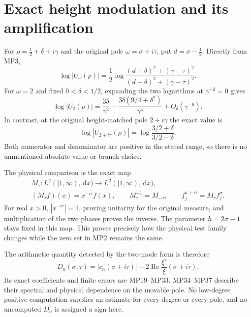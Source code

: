 \documentclass[11pt]{article}
\newcommand{\dd}{\,\mathrm d}
\newcommand{\Rea}{\operatorname{Re}}
\begin{document}
\section{Exact height modulation and its amplification}
For $\rho=\tfrac12+\delta+i\gamma$ and the original pole
$\omega=\sigma+i\tau$, put $d=\sigma-\tfrac12$. Directly from MP3,
\begin{equation}
 \log|U_\omega(\rho)|
 =\frac12\log\frac{(d+\delta)^2+(\gamma-\tau)^2}
                         {(d-\delta)^2+(\gamma-\tau)^2}.
 \tag{MP34}
\end{equation}
For $\omega=2$ and fixed $0<\delta<1/2$, expanding the two logarithms
at $\gamma^{-2}=0$ gives
\begin{equation}
 \log|U_2(\rho)|
 =\frac{3\delta}{\gamma^2}
   -\frac{3\delta(9/4+\delta^2)}{\gamma^4}
   +O_\delta(\gamma^{-6}).\tag{MP35}
\end{equation}
In contrast, at the original height-matched pole $2+i\gamma$ the exact
value is
\begin{equation}
 \log|U_{2+i\gamma}(\rho)|
       =\log\frac{3/2+\delta}{3/2-\delta}.
 \tag{MP36}
\end{equation}
Both numerator and denominator are positive in the stated range, so
there is no unmentioned absolute-value or branch choice.

The physical comparison is the exact map
\begin{equation}
 \begin{gathered}
 M_\tau:L^2([1,\infty),\dd x)\longrightarrow L^2([1,\infty),\dd x),
 \\ (M_\tau f)(x)=x^{-i\tau}f(x),
 \qquad M_\tau^{-1}=M_{-\tau},\qquad
 f_j^{\sigma+i\tau}=M_\tau f_j^\sigma.
 \end{gathered}
 \tag{MP37}
\end{equation}
For real $x>0$, $|x^{-i\tau}|=1$, proving unitarity for the original
measure, and multiplication of the two phases proves the inverse.
The parameter $h=2\sigma-1$ stays fixed in this map. This proves precisely
how the physical test family changes while the zero set in MP2 remains
the same.

The arithmetic quantity detected by the two-mode form is therefore
\begin{equation}
 D_n(\sigma,\tau)=|c_n(\sigma+i\tau)|-
            2\Rea\frac{\xi'}{\xi}(\sigma+i\tau).
 \tag{MP38}
\end{equation}
Its exact coefficients and finite errors are MP19--MP33. MP34--MP37
describe their spectral and physical dependence on the movable pole.
No low-degree positive computation supplies an estimate for every
degree or every pole, and no uncomputed $D_n$ is assigned a sign here.
\end{document}
